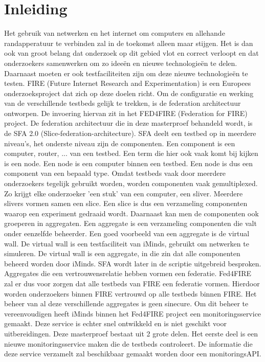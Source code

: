 \chapter{Inleiding}
\npar
Het gebruik van netwerken en het internet om computers en allehande randapperatuur te verbinden zal in de toekomst alleen maar stijgen. Het is dan ook van groot belang dat onderzoek op dit gebied vlot en correct verloopt en dat onderzoekers samenwerken om zo idee\"en en nieuwe technologie\"en te delen. Daarnaast moeten er ook testfaciliteiten zijn om deze nieuwe technologie\"en te testen.
FIRE (Future Internet Research and Experimentation) is een Europees onderzoeksproject dat zich op deze doelen richt.
\npar
Om de configuratie en werking van de verschillende testbeds gelijk te trekken, is de federation architectuur ontworpen. De invoering hiervan zit in het FED4FIRE (Federation for FIRE) project. De federation architectuur die in deze masterproef behandeld wordt, is de SFA 2.0 (Slice-federation-architecture). SFA deelt een testbed op in meerdere niveau's, het onderste niveau zijn de componenten. Een component is een computer, router, ... van een testbed. Een term die hier ook vaak komt bij kijken is een node. Een node is een computer binnen een testbed. Een node is dus een component van een bepaald type. 
\npar
Omdat testbeds vaak door meerdere onderzoekers tegelijk gebruikt worden, worden componenten vaak gemultiplexed. Zo krijgt elke onderzoeker 'een stuk' van een computer, een sliver. Meerdere slivers vormen samen een slice. Een slice is dus een verzameling componenten waarop een experiment gedraaid wordt. 
\npar
Daarnaast kan men de componenten ook groeperen in aggregaten. Een aggregate is een verzameling componenten die valt onder eenzelfde beheerder. Een goed voorbeeld van een aggregate is de virtual wall. De virtual wall is een testfaciliteit van iMinds, gebruikt om netwerken te simuleren. De virtual wall is een aggregate, in die zin dat alle componenten beheerd worden door iMinds. SFA wordt later in de scriptie uitgebreid besproken.
\npar
Aggregates die een vertrouwensrelatie hebben vormen een federatie. Fed4FIRE zal er dus voor zorgen dat alle testbeds van FIRE een federatie vormen. Hierdoor worden onderzoekers binnen FIRE vertrouwd op alle testbeds binnen FIRE.
\clearpage
\npar
Het beheer van al deze verschillende aggregates is geen sinecure. Om dit beheer te vereenvoudigen heeft iMinds binnen het Fed4FIRE project een monitoringsservice gemaakt. Deze service is echter snel ontwikkeld en is niet geschikt voor uitbereidingen. Deze masterproef bestaat uit 2 grote delen. Het eerste deel is een nieuwe monitoringsservice maken die de testbeds controleert. De informatie die deze service verzamelt zal beschikbaar gemaakt worden door een monitoringsAPI. 
